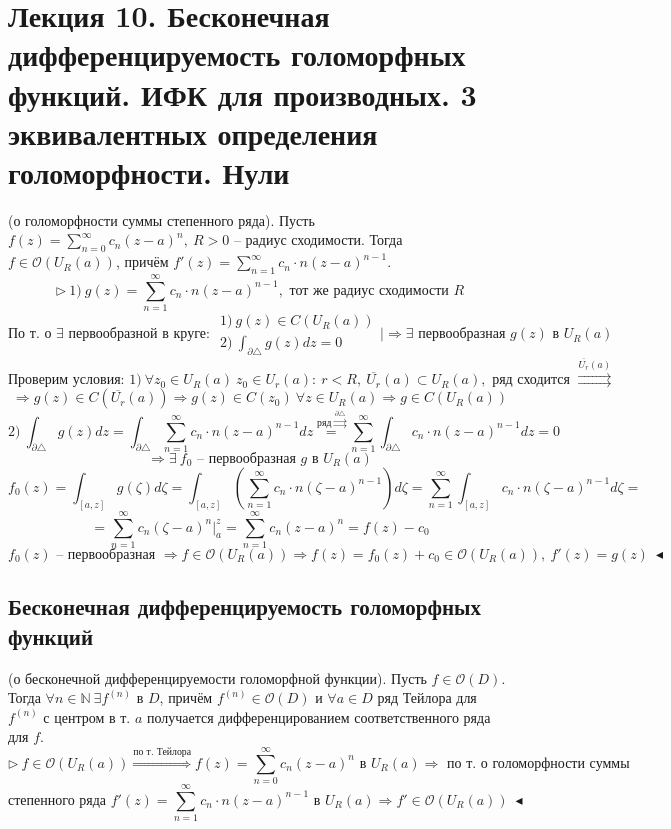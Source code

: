 \section{Лекция 10. Бесконечная дифференцируемость голоморфных функций. ИФК для производных. 3 эквивалентных определения голоморфности. Нули}

 (о голоморфности суммы степенного ряда). Пусть $f(z) = \sum_{n=0}^\infty c_n(z-a)^n, \ R > 0$ -- радиус сходимости. Тогда $f \in \mathcal{O}(U_R(a))$, причём $f'(z) = \sum_{n=1}^\infty c_n \cdot n(z-a)^{n-1}$.
\[\triangleright \ 1) \ g(z) = \sum_{n=1}^\infty c_n \cdot n (z-a)^{n-1}, \text{ тот же радиус сходимости } R\]
\[\text{По т. о $\exists$ первообразной в круге: } \begin{array}{ll}
    1) \ g(z) \in C(U_R(a)) \\
    2) \ \int_{\partial \triangle} g(z) dz = 0
\end{array}\Big| \Rightarrow \exists \text{ первообразная } g(z) \text{ в } U_{R}(a)\]
\[\text{Проверим условия: } 1) \ \forall z_0 \in U_R(a) \ z_0 \in U_r(a): \ r < R, \ \overline{U_r}(a) \subset U_R(a), \text{ ряд сходится } \overset{\overline{U_r}(a)}{\rightrightarrows}\]
\[\Rightarrow g(z) \in C(\overline{U_r}(a)) \Rightarrow g(z) \in C(z_0) \ \forall z \in U_R(a) \Rightarrow g \in C(U_R(a))\]
\[2) \ \int_{\partial \triangle} g(z) dz = \int_{\partial \triangle} \sum_{n=1}^\infty c_n\cdot n (z-a)^{n-1}dz \overset{\text{ряд } \overset{\partial \triangle}{\rightrightarrows}}{=} \sum_{n=1}^\infty \int_{\partial \triangle} c_n \cdot n (z-a)^{n-1} dz = 0\]
\[\Rightarrow \exists \ f_0 \text{ -- первообразная $g$ в } U_R(a)\]
\[f_0(z) = \int_{[a, z]} g(\zeta) d\zeta = \int_{[a, z]} \left(\sum_{n=1}^\infty c_n \cdot n(\zeta-a)^{n-1}\right)d\zeta = \sum_{n=1}^\infty \int_{[a, z]} c_n \cdot n (\zeta - a)^{n-1}d\zeta =\] 
\[=\sum_{n=1}^\infty c_n (\zeta - a)^n \Big|_a^z = \sum_{n=1}^\infty c_n(z-a)^n = f(z) - c_0\]
\[f_0(z) \text{ -- первообразная } \Rightarrow f \in \mathcal{O}(U_R(a))\Rightarrow f(z) = f_0(z) + c_0 \in \mathcal{O}(U_R(a)), \ f'(z) = g(z) \ \blacktriangleleft\]

\subsection{Бесконечная дифференцируемость голоморфных функций}
 (о бесконечной дифференцируемости голоморфной функции). Пусть $f \in \mathcal{O}(D).$ Тогда $\forall n \in \mathbb{N} \ \exists f^{(n)}$ в $D$, причём $f^{(n)}\in \mathcal{O}(D)$ и $\forall a \in D$ ряд Тейлора для $f^{(n)}$ с центром в т. $a$ получается дифференцированием соответственного ряда для $f$.
\[\triangleright \ f \in \mathcal{O}(U_R(a)) \overset{\text{по т. Тейлора}}{\Rightarrow} f(z) = \sum_{n=0}^\infty c_n(z-a)^n \text{ в } U_R(a) \Rightarrow \text{ по т. о голоморфности суммы }\]
\[\text{степенного ряда } f'(z) = \sum_{n=1}^\infty c_n \cdot n (z-a)^{n-1} \text{ в } U_R(a) \Rightarrow f' \in \mathcal{O}(U_R(a)) \ \blacktriangleleft\]

